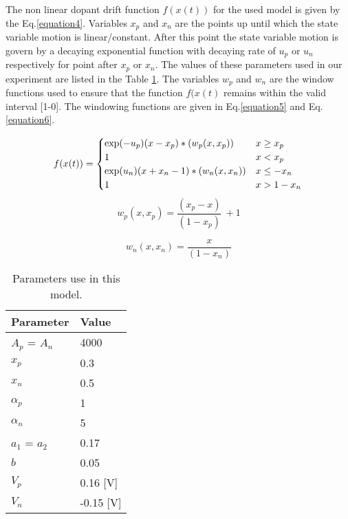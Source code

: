 \documentclass[review]{elsarticle}
\begin{document}
The non linear dopant drift  function $f(x(t))$ for the used model is given by the Eq.\ref{equation4}. Variables $x_{p}$ and $x_{n}$ are the points up until which the state variable motion is linear/constant. After this point the state variable motion is govern by a decaying exponential function with decaying rate of $u_{p}$ or $u_{n}$ respectively for point after $x_{p}$ or $x_{n}$. The values of these parameters used in our experiment are listed in the Table \ref{table:mem}. The variables $w_{p}$ and $w_{n}$ are the window functions used to ensure that the function $f(x(t)$ remains within the valid interval [1-0]. The windowing functions are given in Eq.\ref{equation5} and Eq. \ref{equation6}.

\begin {equation}
\label{equation4}
f(x(t))=  \begin{cases} \exp (-u_p) (x-x_p) * (w_p (x,x_p)) & x\geq x_p\\ 1 & x<x_p\\ \exp(u_n)(x+x_n-1) * (w_n(x,x_n)) & x \leq -x_n\\ 1 & x>1-x_n \end{cases}\\
\end {equation}
\begin {equation}
\label{equation5}
w_p (x,x_p)= \frac {(x_p-x)}{(1-x_p)}\ + 1
\end {equation}

\begin {equation}
\label{equation6}
w_n(x,x_n) = \frac {x}{(1-x_n)}
\end {equation}


\begin{table}[h]
\centering
\caption{Parameters use in this model.}
\label{table:mem}
\begin{tabular}{|l|l|}
 \hline
  Parameter &  Value\\
 \hline
$A_{p}$ = $A_{n}$& 4000\\
\cline{1-2}
$x_{p}$& 0.3\\
\cline{1-2}
$x_{n}$& 0.5 \\
\cline{1-2}
$\alpha_{p}$& 1 \\
\cline{1-2}
$\alpha_{n}$& 5 \\
\cline{1-2}
$a_{1}$ = $a_{2}$ & 0.17 \\
\cline{1-2}
$b$& 0.05 \\
\cline{1-2}
$V_{p}$& 0.16 [V] \\
\cline{1-2}
$V_{n}$& -0.15 [V] \\
 \hline
 \end{tabular}
\end{table}
\end{document}
